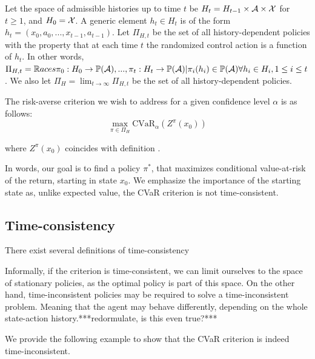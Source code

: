 \begin{definition}
Let the space of admissible histories up to time $t$ be $H_t = H_{t-1} \times \mathcal{A} \times \mathcal{X}$ for $t \ge 1$, and $H_0 = \mathcal{X}$. A generic element $h_t \in H_t$ is of the form $h_t = (x_0, a_0, ..., x_{t-1}, a_{t-1})$. Let $\Pi_{H,t}$ be the set of all history-dependent policies with the property that at each time $t$ the randomized control action is a function of $h_t$. In other words, 
$\Pi_{H,t} = \mathbb{R}aces{\pi_0: H_0 \to \mathbb{P}(\mathcal{A}), ..., \pi_t: H_t \to \mathbb{P}(\mathcal{A})|\pi_i(h_i) \in \mathbb{P}(\mathcal{A}) \forall h_i \in H_i, 1\le i\le t}$. We also let $\Pi_H = \lim_{t\to\infty}\Pi_{H,t}$ be the set of all history-dependent policies.
\end{definition}

The risk-averse criterion we wish to address for a given confidence level $\alpha$ is as follows:
\begin{equation}\label{eqn:prelim:problem}
\max_{\pi \in \Pi_H} \text{CVaR}_\alpha(Z^\pi(x_0))
\end{equation}

where $Z^\pi(x_0)$ coincides with definition .

In words, our goal is to find a policy $\pi^*$, that maximizes conditional value-at-risk of the return, starting in state $x_0$. We emphasize the importance of the starting state as, unlike expected value, the CVaR criterion is not time-consistent.


\subsection{Time-consistency}

There exist several definitions of time-consistency \cite{many}

Informally, if the criterion is time-consistent, we can limit ourselves to the space of stationary policies, as the optimal policy is part of this space. On the other hand, time-inconsistent policies may be required to solve a time-inconsistent problem. Meaning that the agent may behave differently, depending on the whole state-action history.***redormulate, is this even true?***

We provide the following example to show that the CVaR criterion is indeed time-inconsistent.




